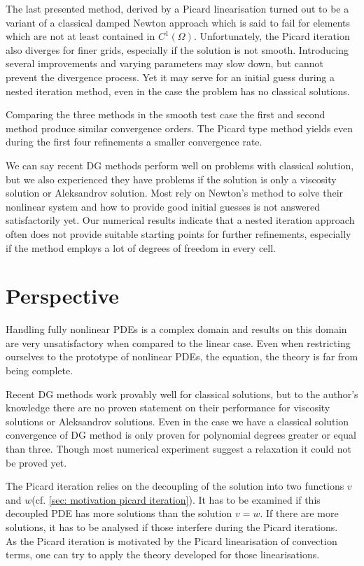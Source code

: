 The last presented method, derived by a Picard linearisation turned out to be a variant of a classical damped Newton approach which is said to fail for elements which are not at least contained in $C^1(\Omega)$.
Unfortunately, the Picard iteration also diverges for finer grids, especially if the solution is not smooth. Introducing several improvements and varying parameters may slow down, but cannot prevent the divergence process. Yet it may serve for an initial guess during a nested iteration method, even in the case the problem has no classical solutions.

Comparing the three methods in the smooth test case the first and second method produce similar convergence orders. %
The Picard type method yields even during the first four refinements a smaller convergence rate. 

We can say recent DG methods perform well on problems with classical solution, but we also experienced they have problems if the \MA solution is only a viscosity solution or Aleksandrov solution. Most rely on Newton's method to solve their nonlinear system and how to provide good initial guesses is not answered satisfactorily yet.
Our numerical results indicate that a nested iteration approach often does not provide suitable starting points for further refinements, especially if the method employs a lot of degrees of freedom in every cell.

\section{Perspective}
Handling fully nonlinear PDEs is a complex domain and results on this domain are very unsatisfactory when compared to the linear case. Even when restricting ourselves to the prototype of nonlinear PDEs, the \MA equation, the theory is far from being complete. %

Recent DG methods work provably well for classical solutions, but to the author's knowledge there are no proven statement on their performance for viscosity solutions or Aleksandrov solutions. Even in the case we have a classical solution convergence of DG method is only proven for polynomial degrees greater or equal than three. Though most numerical experiment suggest a relaxation it could not be proved yet.

The Picard iteration relies on the decoupling of the solution into two functions $v$ and $w$(cf. \ref{sec: motivation picard iteration}). It has to be examined if this decoupled PDE has more solutions than the solution $v=w$. If there are more solutions, it has to be analysed if those interfere during the Picard iterations. \\
As the Picard iteration is motivated by the Picard linearisation of convection terms, one can try to apply the theory developed for those linearisations.

